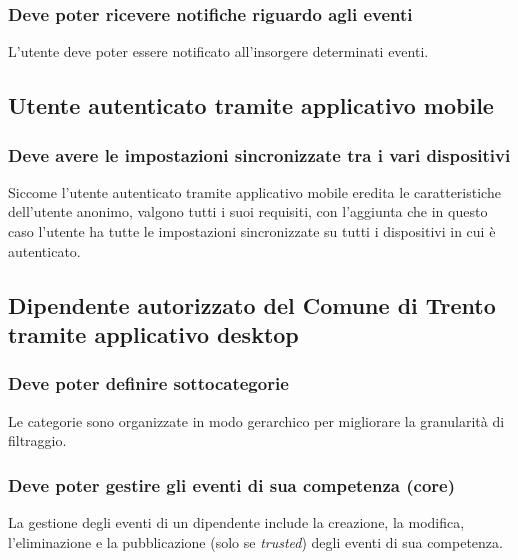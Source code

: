 \documentclass{article}
\begin{document}
\subsubsection{Deve poter ricevere notifiche riguardo agli eventi}
\label{5.1.10}
L'utente deve poter essere notificato all'insorgere determinati eventi.

\subsection{Utente autenticato tramite applicativo mobile}

\subsubsection{Deve avere le impostazioni sincronizzate tra i vari dispositivi}
\label{5.2.1}
Siccome l'utente autenticato tramite applicativo mobile eredita le caratteristiche dell'utente anonimo, valgono tutti i suoi requisiti, con l'aggiunta che in questo caso l'utente ha tutte le impostazioni sincronizzate su tutti i dispositivi in cui è autenticato.

\subsection{Dipendente autorizzato del Comune di Trento tramite applicativo desktop}

\subsubsection{Deve poter definire sottocategorie}
\label{5.3.1}
Le categorie sono organizzate in modo gerarchico per migliorare la granularità di filtraggio.

\subsubsection{Deve poter gestire gli eventi di sua competenza (core)}
\label{5.3.2}
La gestione degli eventi di un dipendente include la creazione, la modifica, l'eliminazione e la pubblicazione (solo se \textit{trusted}) degli eventi di sua competenza.
\end{document}
